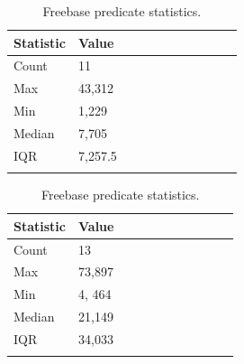 \begin{table}[H]
	\parbox{.5\linewidth}{
		\centering
		\begin{tabular}{lllllllllll}
  			\textbf{Statistic} & \textbf{Value}  \\
  			\hline
			Count & 11 \\
			Max & 43,312  \\
			Min & 1,229  \\
  			Median & 7,705  \\
  			IQR & 7,257.5  \\
				&
		\end{tabular}
		\captionsetup{justification=centering}
		\caption{WordNet predicate statistics.}
		}
	\hfill
	\parbox{.5\linewidth}{
		\centering
		\begin{tabular}{lllllllllll}
  			\textbf{Statistic} & \textbf{Value}  \\
  			\hline
			Count & 13 \\
			Max & 73,897  \\
			Min & 4, 464  \\
  			Median & 21,149  \\
  			IQR & 34,033  \\
				&
		\end{tabular} 
		\captionsetup{justification=centering}
		\caption{Freebase predicate statistics.}
		}
\end{table}



